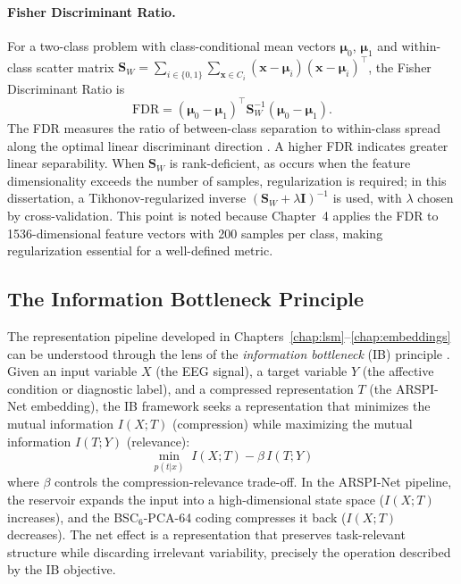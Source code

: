 \paragraph{Fisher Discriminant Ratio.}
For a two-class problem with class-conditional mean vectors $\boldsymbol{\mu}_0$, $\boldsymbol{\mu}_1$ and within-class scatter matrix $\mathbf{S}_W = \sum_{i \in \{0,1\}} \sum_{\mathbf{x} \in C_i} (\mathbf{x} - \boldsymbol{\mu}_i)(\mathbf{x} - \boldsymbol{\mu}_i)^\top$, the Fisher Discriminant Ratio is
\begin{equation}
    \text{FDR} = (\boldsymbol{\mu}_0 - \boldsymbol{\mu}_1)^\top \mathbf{S}_W^{-1} (\boldsymbol{\mu}_0 - \boldsymbol{\mu}_1).
    \label{eq:fdr}
\end{equation}
The FDR measures the ratio of between-class separation to within-class spread along the optimal linear discriminant direction \cite{duda_pattern_2001}. A higher FDR indicates greater linear separability. When $\mathbf{S}_W$ is rank-deficient, as occurs when the feature dimensionality exceeds the number of samples, regularization is required; in this dissertation, a Tikhonov-regularized inverse $(\mathbf{S}_W + \lambda \mathbf{I})^{-1}$ is used, with $\lambda$ chosen by cross-validation. This point is noted because Chapter~4 applies the FDR to 1536-dimensional feature vectors with 200 samples per class, making regularization essential for a well-defined metric.

\subsection{The Information Bottleneck Principle}
\label{sec:info_bottleneck}

The representation pipeline developed in Chapters~\ref{chap:lsm}--\ref{chap:embeddings} can be understood through the lens of the \emph{information bottleneck} (IB) principle \cite{tishby_deep_2015}. Given an input variable $X$ (the EEG signal), a target variable $Y$ (the affective condition or diagnostic label), and a compressed representation $T$ (the ARSPI-Net embedding), the IB framework seeks a representation that minimizes the mutual information $I(X; T)$ (compression) while maximizing the mutual information $I(T; Y)$ (relevance):
\begin{equation}
    \min_{p(t|x)} \; I(X; T) - \beta \, I(T; Y)
    \label{eq:ib}
\end{equation}
where $\beta$ controls the compression-relevance trade-off. In the ARSPI-Net pipeline, the reservoir expands the input into a high-dimensional state space ($I(X; T)$ increases), and the BSC$_6$-PCA-64 coding compresses it back ($I(X; T)$ decreases). The net effect is a representation that preserves task-relevant structure while discarding irrelevant variability, precisely the operation described by the IB objective.

